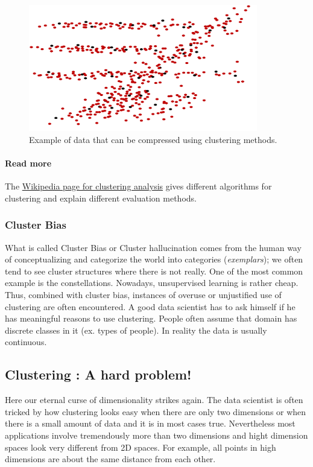 \begin{figure}[H]%
 \centering
 \includegraphics[width=10cm]{./img/09/compression}
 \caption{\label{pic:compression} Example of data that can be compressed using clustering methods.}
\end{figure}

\paragraph{Read more}

The \href{https://en.wikipedia.org/wiki/Cluster\_analysis}{Wikipedia page for clustering analysis} gives different algorithms for clustering and explain different evaluation methods. 

\subsubsection{Cluster Bias}

What is called Cluster Bias or Cluster hallucination comes from the human way of conceptualizing and categorize the world into categories (\emph{exemplars}); we often tend to see cluster structures where there is not really. One of the most common example is the constellations. Nowadays, unsupervised learning is rather cheap. Thus, combined with cluster bias, instances of overuse or unjustified use of clustering are often encountered. A good data scientist has to ask himself if he has meaningful reasons to use clustering. People often assume that domain has discrete classes in it (ex. types of people). In reality the data is usually continuous. 

\subsection{Clustering : A hard problem!}

Here our eternal curse of dimensionality strikes again. The data scientist is often tricked by how clustering looks easy when there are only two dimensions or when there is a small amount of data and it is in most cases true. Nevertheless most applications involve tremendously more than two dimensions and hight dimension spaces look very different from 2D spaces. For example, all points in high dimensions are about the same distance from each other. 

